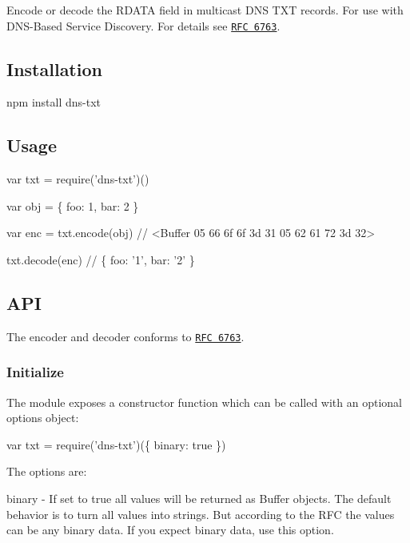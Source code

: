 Encode or decode the R\+D\+A\+TA field in multicast D\+NS T\+XT records. For use with D\+N\+S-\/\+Based Service Discovery. For details see \href{https://tools.ietf.org/html/rfc6763}{\tt R\+FC 6763}.

\href{https://travis-ci.org/watson/dns-txt}{\tt } \href{https://github.com/feross/standard}{\tt } \href{https://github.com/mafintosh/abstract-encoding}{\tt }

\subsection*{Installation}


\begin{DoxyCode}
npm install dns-txt
\end{DoxyCode}


\subsection*{Usage}


\begin{DoxyCode}
var txt = require('dns-txt')()

var obj = \{
  foo: 1,
  bar: 2
\}

var enc = txt.encode(obj) // <Buffer 05 66 6f 6f 3d 31 05 62 61 72 3d 32>

txt.decode(enc) // \{ foo: '1', bar: '2' \}
\end{DoxyCode}


\subsection*{A\+PI}

The encoder and decoder conforms to \href{https://tools.ietf.org/html/rfc6763}{\tt R\+FC 6763}.

\subsubsection*{Initialize}

The module exposes a constructor function which can be called with an optional options object\+:


\begin{DoxyCode}
var txt = require('dns-txt')(\{ binary: true \})
\end{DoxyCode}


The options are\+:


\begin{DoxyItemize}
\item {\ttfamily binary} -\/ If set to {\ttfamily true} all values will be returned as {\ttfamily Buffer} objects. The default behavior is to turn all values into strings. But according to the R\+FC the values can be any binary data. If you expect binary data, use this option.
\end{DoxyItemize}

